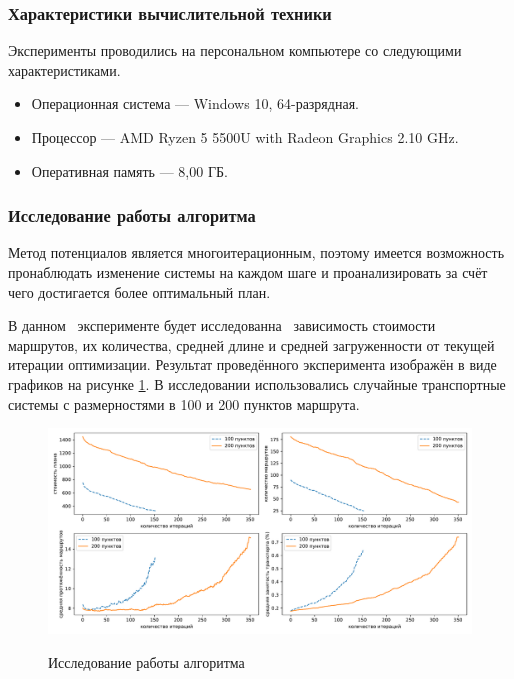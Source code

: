 \subsubsection{Характеристики вычислительной техники}
Эксперименты проводились на персональном компьютере со следующими характеристиками.

\begin{itemize}
	\item Операционная система --- Windows 10, 64-разрядная.
	\item Процессор --- AMD Ryzen 5 5500U with Radeon Graphics 2.10 GHz.
	\item Оперативная память --- 8,00 ГБ.
\end{itemize}

\subsubsection{Исследование работы алгоритма}
Метод потенциалов является многоитерационным, поэтому имеется возможность пронаблюдать изменение системы на каждом шаге и проанализировать за счёт чего достигается более оптимальный план. 

В данном \, эксперименте будет исследованна \, зависимость стоимости \, маршрутов, их количества, средней длине и средней загруженности от текущей итерации оптимизации. Результат проведённого эксперимента изображён в виде графиков на рисунке \ref{exp:iter100}. В исследовании использовались случайные транспортные системы с размерностями в 100 и 200 пунктов маршрута.

\begin{figure}[h!]
	\begin{center}
		{\includegraphics[scale=0.53, angle=0, page=1]{research/detailed_report.pdf}}
		\caption{Исследование работы алгоритма}
		\label{exp:iter100}
	\end{center}
\end{figure}

